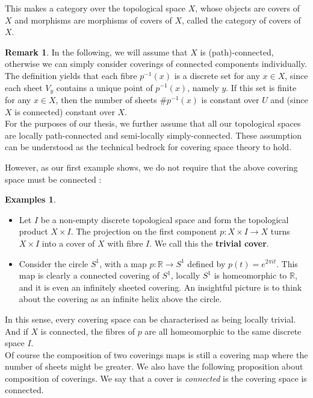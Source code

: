 \documentclass{article}
\theoremstyle{plain}
\theoremstyle{definition}
\newtheorem{remark}{Remark}
\newtheorem{examples}[theorem]{Examples}
\begin{document}
\noindent This makes a category over the topological space $X$, whose objects are covers of $X$ and morphisms are morphisms of covers of $X$, called the category of covers of $X$.\\


\begin{remark}
\label{connected_constant_sheets}
    In the following, we will assume that $X$ is (path)-connected, otherwise we can simply consider coverings of connected components individually. The definition yields that each fibre $p^{-1}(x)$ is a discrete set for any $x\in X$, since each sheet $V_y$ contains a unique point of $p^{-1}(x)$, namely $y$. If this set is finite for any $x\in X$, then the number of sheets $\#p^{-1}(x)$ is constant over $U$ and (since $X$ is connected) constant over $X$.\\
    \noindent For the purposes of our thesis, we further assume that all our topological spaces are locally path-connected and semi-locally simply-connected. 
    These assumption can be understood as the technical bedrock for covering space theory to hold.
\end{remark} 
\noindent However, as our first example shows, we do not require that the above covering space must be connected :

\begin{examples}
\label{example_covering}\textbf{ }
\begin{itemize}
    \item[$a)$] Let $I$ be a non-empty discrete topological space and form the topological product $X\times I$. The projection on the first component $p:X\times I\rightarrow X$ turns $X\times I$ into a cover of $X$ with fibre $I$. We call this the \textbf{trivial cover}.

    \item[$b)$] Consider the circle $S^1$, with a map $p:\mathbb{R}\rightarrow S^1$ defined by $p(t)=e^{2\pi i t}$. This map is clearly a connected covering of $S^1$, locally $S^1$ is homeomorphic to $\mathbb{R}$, and it is even an infinitely sheeted covering. An insightful picture is to think about the covering as an infinite helix above the circle.
\end{itemize} 
\end{examples}
\noindent In this sense, every covering space can be characterised as being locally trivial. And if $X$ is connected, the fibres of $p$ are all homeomorphic to the same discrete space $I$.\\

\noindent Of course the composition of two coverings maps is still a covering map where the number of sheets might be greater. We also have the following proposition about composition of coverings. 
We say that a cover is \textit{connected} is the covering space is connected.
\end{document}
